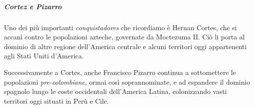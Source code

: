 \documentclass[11pt]{report}
\begin{document}
	 \subparagraph*{Cortez e Pizarro} Uno dei più importanti \textit{conquistadores} che ricordiamo è Hernan Cortes, che si accanì contro le popolazioni azteche, governate da Moctezuma II. Ciò li porta al dominio di altre regione dell'America centrale e alcuni territori oggi appartenenti agli Stati Uniti d'America. 
	
	Successivamente a Cortes, anche Francisco Pizarro continua a sottomettere le popolazioni \textit{pre-colombiane}, ormai così soprannominate, e ad espandere il dominio spagnolo lungo le coste occidentali dell'America Latina, colonizzando vasti territori oggi situati in Perù e Cile.
	
	
	
	
\end{document}
